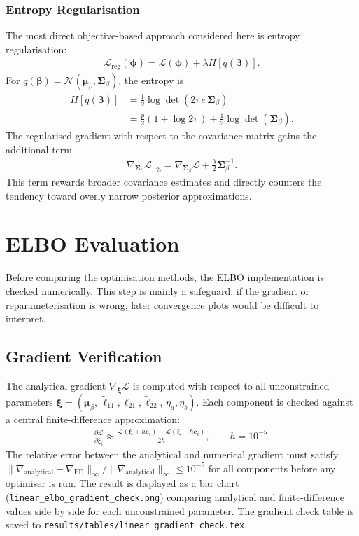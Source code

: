 \documentclass[11pt,a4paper]{article}
\newcommand{\N}{\mathcal{N}}
\begin{document}
\subsubsection{Entropy Regularisation}

The most direct objective-based approach considered here is entropy regularisation:
\begin{align}
\mathcal{L}_{\mathrm{reg}}(\bm{\phi})
= \mathcal{L}(\bm{\phi}) + \lambda H[q(\bm{\beta})].
\end{align}
For $q(\bm{\beta})=\N(\bm{\mu}_\beta,\bm{\Sigma}_\beta)$, the entropy is
\begin{align}
H[q(\bm{\beta})]
&= \frac{1}{2}\log\det(2\pi e\,\bm{\Sigma}_\beta)\\
&= \frac{p}{2}(1+\log 2\pi) + \frac{1}{2}\log\det(\bm{\Sigma}_\beta).
\end{align}
The regularised gradient with respect to the covariance matrix gains the additional term
\begin{align}
\nabla_{\bm{\Sigma}_\beta}\mathcal{L}_{\mathrm{reg}}
= \nabla_{\bm{\Sigma}_\beta}\mathcal{L}
+ \frac{\lambda}{2}\bm{\Sigma}_\beta^{-1}.
\end{align}
This term rewards broader covariance estimates and directly counters the tendency toward overly narrow posterior approximations.
\section{ELBO Evaluation}
\label{sec:elbo-evaluation}

Before comparing the optimisation methods, the ELBO implementation is checked numerically. This step is mainly a safeguard: if the gradient or reparameterisation is wrong, later convergence plots would be difficult to interpret.

\subsection{Gradient Verification}

The analytical gradient $\nabla_{\bm{\xi}}\mathcal{L}$ is computed with respect to all unconstrained
parameters $\bm{\xi} = (\bm{\mu}_\beta,\, \tilde{\ell}_{11}, \ell_{21}, \tilde{\ell}_{22},\, \eta_a, \eta_b)$.
Each component is checked against a central finite-difference approximation:
\begin{align}
  \frac{\partial \mathcal{L}}{\partial \xi_i} \approx \frac{\mathcal{L}(\bm{\xi} + h\bm{e}_i) - \mathcal{L}(\bm{\xi} - h\bm{e}_i)}{2h}, \qquad h = 10^{-5}.
\end{align}
The relative error between the analytical and numerical gradient must satisfy
$\|\nabla_{\mathrm{analytical}} - \nabla_{\mathrm{FD}}\|_\infty / \|\nabla_{\mathrm{analytical}}\|_\infty \leq 10^{-5}$
for all components before any optimiser is run.
The result is displayed as a bar chart (\texttt{linear\_elbo\_gradient\_check.png}) comparing analytical and
finite-difference values side by side for each unconstrained parameter.
The gradient check table is saved to \texttt{results/tables/linear\_gradient\_check.tex}.
\end{document}
